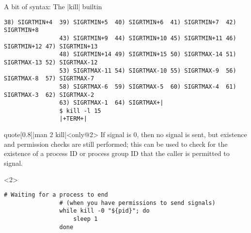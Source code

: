 \begin{frame}[fragile]{A bit of syntax: The \bash|kill| builtin}
\begin{overlayarea}{\textwidth}{0.7\textheight}
\begin{onlyenv}
\begin{lstlisting}[style=MyBash, style=smaller, numbers=none, xleftmargin=1mm]
                38) SIGRTMIN+4  39) SIGRTMIN+5  40) SIGRTMIN+6  41) SIGRTMIN+7  42) SIGRTMIN+8
                43) SIGRTMIN+9  44) SIGRTMIN+10 45) SIGRTMIN+11 46) SIGRTMIN+12 47) SIGRTMIN+13
                48) SIGRTMIN+14 49) SIGRTMIN+15 50) SIGRTMAX-14 51) SIGRTMAX-13 52) SIGRTMAX-12
                53) SIGRTMAX-11 54) SIGRTMAX-10 55) SIGRTMAX-9  56) SIGRTMAX-8  57) SIGRTMAX-7
                58) SIGRTMAX-6  59) SIGRTMAX-5  60) SIGRTMAX-4  61) SIGRTMAX-3  62) SIGRTMAX-2
                63) SIGRTMAX-1  64) SIGRTMAX+|
                $ kill -l 15
                |+TERM+|
            \end{lstlisting}
        \end{onlyenv}
        \vspace{-2mm}
        \begin{varblock}{quote}[0.8\textwidth]{\bash|man 2 kill|}<only@2>
            If signal is 0, then no signal is sent, but existence and permission checks are still performed; this can be used to check for the existence of a process ID or process group ID that the caller is permitted to signal.
        \end{varblock}
        \begin{onlyenv}<2>
            \begin{lstlisting}[style=MyBash, aboveskip=2mm]
                # Waiting for a process to end
                # (when you have permissions to send signals)
                while kill -0 "${pid}"; do
                    sleep 1
                done
            \end{lstlisting}
        \end{onlyenv}
    \end{overlayarea}
\end{frame}
